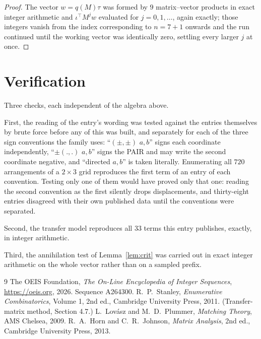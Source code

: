 \documentclass[11pt,a4paper]{article}
\theoremstyle{plain}
\theoremstyle{definition}
\begin{document}
\begin{proof}
The vector $w=q(M)\tau$ was formed by $9$ matrix--vector products in exact integer
arithmetic and $\iota^{\!\top}M^{j}w$ evaluated for $j=0,1,\dots$, again exactly; those
integers vanish from the index corresponding to $n=7+1$ onwards and the run continued
until the working vector was identically zero, settling every larger $j$ at once.
\end{proof}

\section{Verification}

Three checks, each independent of the algebra above.

First, the reading of the entry's wording was tested against the entries themselves by brute
force before any of this was built, and separately for each of the three sign conventions the
family uses: ``$(\pm,\pm)$ $a,b$'' signs each coordinate independently, ``$\pm(.,.)$ $a,b$''
signs the PAIR and may write the second coordinate negative, and ``directed $a,b$'' is taken
literally. Enumerating all $720$ arrangements of a $2\times3$ grid reproduces the first term
of an entry of each convention. Testing only one of them would have proved only that one:
reading the second convention as the first silently drops displacements, and thirty-eight
entries disagreed with their own published data until the conventions were separated.

Second, the transfer model reproduces all $33$ terms this entry publishes, exactly, in
integer arithmetic.

Third, the annihilation test of Lemma~\ref{lem:crit} was carried out in exact integer
arithmetic on the whole vector rather than on a sampled prefix.

\begin{thebibliography}{9}
 The OEIS Foundation, \emph{The On-Line Encyclopedia of Integer
Sequences}, \url{https://oeis.org}, 2026. Sequence A264300.
 R.~P.~Stanley, \emph{Enumerative Combinatorics}, Volume 1, 2nd ed.,
Cambridge University Press, 2011. (Transfer-matrix method, Section 4.7.)
 L.~Lov\'asz and M.~D.~Plummer, \emph{Matching Theory}, AMS Chelsea, 2009.
 R.~A.~Horn and C.~R.~Johnson, \emph{Matrix Analysis}, 2nd ed., Cambridge
University Press, 2013.
\end{thebibliography}
\end{document}
